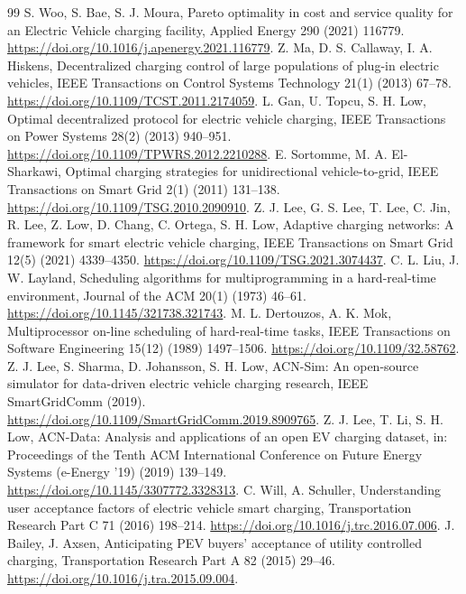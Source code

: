 \documentclass[12pt]{article}
\begin{document}
\begin{thebibliography}{99}
 S. Woo, S. Bae, S. J. Moura, Pareto optimality in cost and service quality for an Electric Vehicle charging facility, Applied Energy 290 (2021) 116779. \url{https://doi.org/10.1016/j.apenergy.2021.116779}.
 Z. Ma, D. S. Callaway, I. A. Hiskens, Decentralized charging control of large populations of plug-in electric vehicles, IEEE Transactions on Control Systems Technology 21(1) (2013) 67--78. \url{https://doi.org/10.1109/TCST.2011.2174059}.
 L. Gan, U. Topcu, S. H. Low, Optimal decentralized protocol for electric vehicle charging, IEEE Transactions on Power Systems 28(2) (2013) 940--951. \url{https://doi.org/10.1109/TPWRS.2012.2210288}.
 E. Sortomme, M. A. El-Sharkawi, Optimal charging strategies for unidirectional vehicle-to-grid, IEEE Transactions on Smart Grid 2(1) (2011) 131--138. \url{https://doi.org/10.1109/TSG.2010.2090910}.
 Z. J. Lee, G. S. Lee, T. Lee, C. Jin, R. Lee, Z. Low, D. Chang, C. Ortega, S. H. Low, Adaptive charging networks: A framework for smart electric vehicle charging, IEEE Transactions on Smart Grid 12(5) (2021) 4339--4350. \url{https://doi.org/10.1109/TSG.2021.3074437}.
 C. L. Liu, J. W. Layland, Scheduling algorithms for multiprogramming in a hard-real-time environment, Journal of the ACM 20(1) (1973) 46--61. \url{https://doi.org/10.1145/321738.321743}.
 M. L. Dertouzos, A. K. Mok, Multiprocessor on-line scheduling of hard-real-time tasks, IEEE Transactions on Software Engineering 15(12) (1989) 1497--1506. \url{https://doi.org/10.1109/32.58762}.
 Z. J. Lee, S. Sharma, D. Johansson, S. H. Low, ACN-Sim: An open-source simulator for data-driven electric vehicle charging research, IEEE SmartGridComm (2019). \url{https://doi.org/10.1109/SmartGridComm.2019.8909765}.
 Z. J. Lee, T. Li, S. H. Low, ACN-Data: Analysis and applications of an open EV charging dataset, in: Proceedings of the Tenth ACM International Conference on Future Energy Systems (e-Energy '19) (2019) 139--149. \url{https://doi.org/10.1145/3307772.3328313}.
 C. Will, A. Schuller, Understanding user acceptance factors of electric vehicle smart charging, Transportation Research Part C 71 (2016) 198--214. \url{https://doi.org/10.1016/j.trc.2016.07.006}.
 J. Bailey, J. Axsen, Anticipating PEV buyers' acceptance of utility controlled charging, Transportation Research Part A 82 (2015) 29--46. \url{https://doi.org/10.1016/j.tra.2015.09.004}.

\end{thebibliography}
\end{document}
